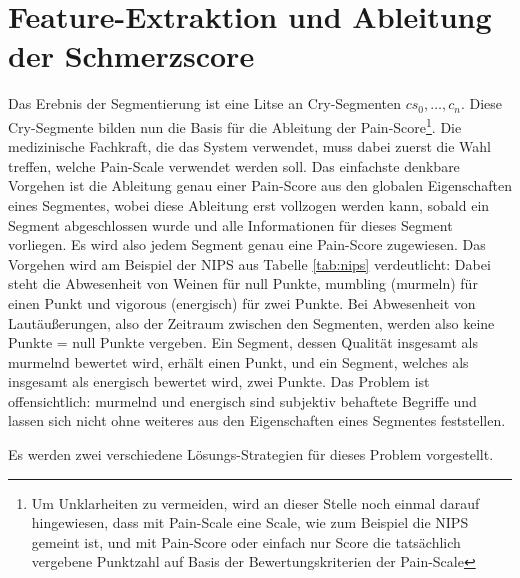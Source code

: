 \section{Feature-Extraktion und Ableitung der Schmerzscore}
\label{sec:overviewPainRegression}

Das Erebnis der Segmentierung ist eine Litse an Cry-Segmenten $cs_0,  \ldots , c_n$. Diese Cry-Segmente bilden nun die Basis für die Ableitung der Pain-Score\footnote{Um Unklarheiten zu vermeiden, wird an dieser Stelle noch einmal darauf hingewiesen, dass mit \glqq Pain-Scale\grqq{} eine Scale, wie zum Beispiel die NIPS gemeint ist, und mit \glqq Pain-Score\glqq{} oder einfach nur \glqq Score\grqq{} die tatsächlich vergebene Punktzahl auf Basis der Bewertungskriterien der Pain-Scale}. Die medizinische Fachkraft, die das System verwendet, muss dabei zuerst die Wahl treffen, welche Pain-Scale verwendet werden soll. Das einfachste denkbare Vorgehen ist die Ableitung genau einer Pain-Score aus den globalen Eigenschaften eines Segmentes, wobei diese Ableitung erst vollzogen werden kann, sobald ein Segment abgeschlossen wurde und alle Informationen für dieses Segment vorliegen. Es wird also jedem Segment genau eine Pain-Score zugewiesen. Das Vorgehen wird am Beispiel der NIPS aus Tabelle \ref{tab:nips} verdeutlicht: Dabei steht die Abwesenheit von Weinen für null Punkte, \glqq mumbling\grqq{} (murmeln) für einen Punkt und \glqq vigorous\grqq{} (energisch) für zwei Punkte. Bei Abwesenheit von Lautäußerungen, also der Zeitraum zwischen den Segmenten, werden also keine Punkte = null Punkte vergeben. Ein Segment, dessen Qualität insgesamt als \glqq murmelnd\grqq{} bewertet wird, erhält einen Punkt, und ein Segment, welches als insgesamt als \glqq energisch\grqq{} bewertet wird, zwei Punkte. Das Problem ist offensichtlich: \glqq murmelnd\grqq{} und \glqq energisch\grqq{} sind subjektiv behaftete Begriffe und lassen sich nicht ohne weiteres aus den Eigenschaften eines Segmentes feststellen. 

Es werden zwei verschiedene Lösungs-Strategien für dieses Problem vorgestellt. 

\vspace{5mm}

